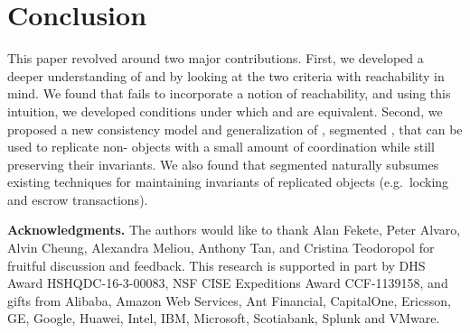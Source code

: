 \section{Conclusion}
This paper revolved around two major contributions.  First, we developed a
deeper understanding of \invariantclosure{} and \invariantconfluence{} by
looking at the two criteria with reachability in mind. We found that
\invariantclosure{} fails to incorporate a notion of reachability, and using
this intuition, we developed conditions under which \invariantclosure{} and
\invariantconfluence{} are equivalent.  Second, we proposed a new consistency
model and generalization of \invariantconfluence{}, segmented
\invariantconfluence{}, that can be used to replicate non-\invariantconfluent{}
objects with a small amount of coordination while still preserving their
invariants. We also found that segmented \invariantconfluence{} naturally
subsumes existing techniques for maintaining invariants of replicated objects
(e.g.\ locking and escrow transactions).

\textbf{Acknowledgments.}
The authors would like to thank Alan Fekete, Peter Alvaro, Alvin Cheung,
Alexandra Meliou, Anthony Tan, and Cristina Teodoropol for fruitful discussion
and feedback.
%
This research is supported in part by DHS Award HSHQDC-16-3-00083, NSF CISE
Expeditions Award CCF-1139158, and gifts from Alibaba, Amazon Web Services, Ant
Financial, CapitalOne, Ericsson, GE, Google, Huawei, Intel, IBM, Microsoft,
Scotiabank, Splunk and VMware.
